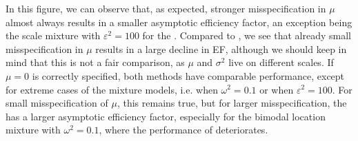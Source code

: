 In this figure, we can observe that, as expected, stronger misspecification in $\mu$ almost always results in a smaller asymptotic efficiency factor, an exception being the scale mixture with $\varepsilon^{2} = 100$ for the \acem. 
Compared to , we see that already small misspecification in $\mu$ results in a large decline in EF, although we should keep in mind that this is not a fair comparison, as $\mu$ and $\sigma^{2}$ live on different scales.
If $\mu = 0 $ is correctly specified, both methods have comparable performance, except for extreme cases of the mixture models, i.e. when $\omega^{2} = 0.1$ or when $\varepsilon^{2} = 100$. 
For small misspecification of $\mu$, this remains true, but for larger misspecification, the \acem has a larger asymptotic efficiency factor, especially for the bimodal location mixture with $\omega^{2} = 0.1$, where the performance of \aeis deteriorates. 


